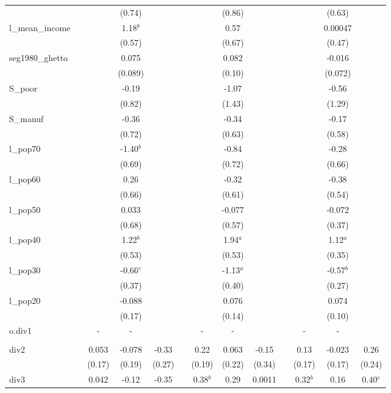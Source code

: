 \documentclass[]{article}
\begin{document}
\begin{tabular}{lcccccccccccc}
 &  &  & (0.74) &  &  &  & (0.86) &  &  &  & (0.63) &  \\
l\_mean\_income &  &  & 1.18$^b$ &  &  &  & 0.57 &  &  &  & 0.00047 &  \\
 &  &  & (0.57) &  &  &  & (0.67) &  &  &  & (0.47) &  \\
seg1980\_ghetto &  &  & 0.075 &  &  &  & 0.082 &  &  &  & -0.016 &  \\
 &  &  & (0.089) &  &  &  & (0.10) &  &  &  & (0.072) &  \\
S\_poor &  &  & -0.19 &  &  &  & -1.07 &  &  &  & -0.56 &  \\
 &  &  & (0.82) &  &  &  & (1.43) &  &  &  & (1.29) &  \\
S\_manuf &  &  & -0.36 &  &  &  & -0.34 &  &  &  & -0.17 &  \\
 &  &  & (0.72) &  &  &  & (0.63) &  &  &  & (0.58) &  \\
l\_pop70 &  &  & -1.40$^b$ &  &  &  & -0.84 &  &  &  & -0.28 &  \\
 &  &  & (0.69) &  &  &  & (0.72) &  &  &  & (0.66) &  \\
l\_pop60 &  &  & 0.26 &  &  &  & -0.32 &  &  &  & -0.38 &  \\
 &  &  & (0.66) &  &  &  & (0.61) &  &  &  & (0.54) &  \\
l\_pop50 &  &  & 0.033 &  &  &  & -0.077 &  &  &  & -0.072 &  \\
 &  &  & (0.68) &  &  &  & (0.57) &  &  &  & (0.37) &  \\
l\_pop40 &  &  & 1.22$^b$ &  &  &  & 1.94$^a$ &  &  &  & 1.12$^a$ &  \\
 &  &  & (0.53) &  &  &  & (0.53) &  &  &  & (0.35) &  \\
l\_pop30 &  &  & -0.66$^c$ &  &  &  & -1.13$^a$ &  &  &  & -0.57$^b$ &  \\
 &  &  & (0.37) &  &  &  & (0.40) &  &  &  & (0.27) &  \\
l\_pop20 &  &  & -0.088 &  &  &  & 0.076 &  &  &  & 0.074 &  \\
 &  &  & (0.17) &  &  &  & (0.14) &  &  &  & (0.10) &  \\
o.div1 &  & - & - &  &  & - & - &  &  & - & - &  \\
 &  &  &  &  &  &  &  &  &  &  &  &  \\
div2 &  & 0.053 & -0.078 & -0.33 &  & 0.22 & 0.063 & -0.15 &  & 0.13 & -0.023 & 0.26 \\
 &  & (0.17) & (0.19) & (0.27) &  & (0.19) & (0.22) & (0.34) &  & (0.17) & (0.17) & (0.24) \\
div3 &  & 0.042 & -0.12 & -0.35 &  & 0.38$^b$ & 0.29 & 0.0011 &  & 0.32$^b$ & 0.16 & 0.40$^c$ \\

\end{tabular}
\end{document}
